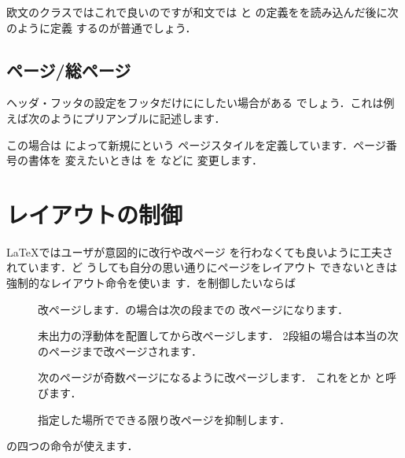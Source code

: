 欧文のクラスではこれで良いのですが和文では  と 
の定義をを読み込んだ後に次のように定義
するのが普通でしょう．

\begin{InTeX}
 \def\chaptermark#1{\markboth{%
   \ifnum \c@secnumdepth >\m@ne
     \if@mainmatter
       \@chapapp\thechapter\@chappos\hskip1zw
     \fi
   \fi
   #1}{}}%
  \def\sectionmark#1{\markright{%
    \ifnum \c@secnumdepth >\z@ \thesection \hskip1zw\fi
    #1}}%
\end{InTeX}


\subsection{ページ/総ページ}

ヘッダ・フッタの設定をフッタだけににしたい場合がある
でしょう．これは例えば次のようにプリアンブルに記述します．

%
%
%
%
%
%
%
%
%
%
%
%
%
\begin{InTeX}
\AtEndDocument{\label{lastpage}}
\makeatletter
 \newcommand{\ps@total}{%
 \let\@mkboth\@gobbletwo
 \let\@oddhead\@empty
 \let\@evenhead\@empty
 \def\@oddfoot{\normalfont\hfil--\thepage/\pageref{lastpage}--\hfil}%
 \let\@evenfoot\@oddfoot}
\makeatother
\pagestyle{total}
\end{InTeX}

この場合は によって新規にという
ページスタイルを定義しています．ページ番号の書体を
変えたいときは を などに
変更します．



\section{レイアウトの制御}%
{\LaTeX}ではユーザが意図的に改行や改ページ
を行わなくても良いように工夫されています．ど
うしても自分の思い通りにページをレイアウト
できないときは強制的なレイアウト命令を使いま
す．{}を制御したいならば
\begin{description}
\item[] 
   改ページします．の場合は次の段までの
  改ページになります．
\item[]	
   未出力の浮動体を配置してから改ページします．
 2段組の場合は本当の次のページまで改ページされます． 
\item[] 
  次のページが奇数ページになるように改ページします．
  これを{}とか{}
  と呼びます．
\item[] 
   指定した場所でできる限り改ページを抑制します．
\end{description}
の四つの命令が使えます．

